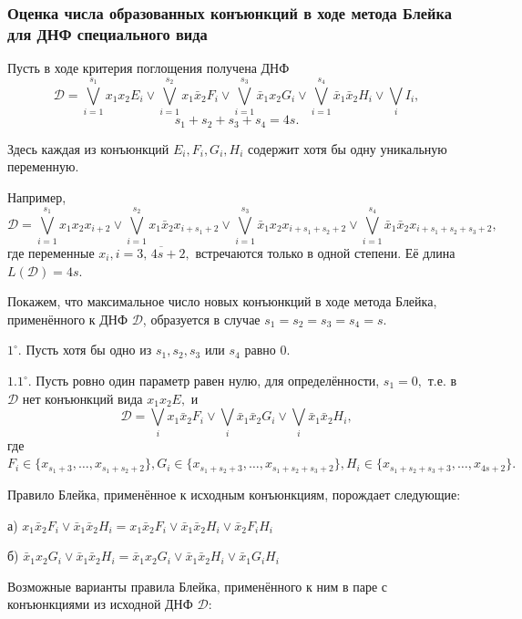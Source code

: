 \documentclass[12pt,a4paper,oneside,fleqn,leqno]{article}
\theoremstyle{definition}
\begin{document}
	\subsubsection*{Оценка числа образованных конъюнкций в ходе метода Блейка для ДНФ специального вида}
			Пусть в ходе критерия поглощения получена ДНФ
			$$
				\mathcal{D} = \bigvee_{i = 1}^{s_1}x_1x_2E_i \vee \bigvee_{i = 1}^{s_2}x_1\bar{x}_2F_i \vee \bigvee_{i = 1}^{s_3}\bar{x}_1x_2G_i \vee \bigvee_{i = 1}^{s_4}\bar{x}_1\bar{x}_2H_i \vee \bigvee_iI_i,
			$$
			$$
				s_1 + s_2 + s_3 + s_4 = 4s.
			$$\par
			Здесь каждая из конъюнкций $E_i, F_i, G_i, H_i$ содержит хотя бы одну уникальную переменную.\par
			Например,
			$$
				\mathcal{D} = \bigvee\limits_{i = 1}^{s_1}x_1x_2x_{i +2} \vee \bigvee\limits_{i = 1}^{s_2}x_1\bar{x}_2x_{i + s_1 + 2} \vee \bigvee\limits_{i = 1}^{s_3}\bar{x}_1x_2x_{i + s_1 + s_2 + 2} \vee \bigvee\limits_{i = 1}^{s_4}\bar{x}_1\bar{x}_2x_{i + s_1 + s_2 + s_3 + 2},
			$$
			где переменные $x_i, i = \overline{3,\,4s+2},$ встречаются только в одной степени. Её длина $L(\mathcal{D}) = 4s.$\par
			Покажем, что максимальное число новых конъюнкций в ходе метода Блейка, применённого к ДНФ $\mathcal{D}$, образуется в случае $s_1 = s_2 = s_3 = s_4 = s.$\par
			$1^{\circ}.$ Пусть хотя бы одно из $s_1, s_2, s_3$ или $s_4$ равно 0.\par
			$1.1^{\circ}.$ Пусть ровно один параметр равен нулю, для определённости, $s_1 = 0,$ т.е. в $\mathcal{D}$ нет конъюнкций вида $x_1x_2E,$ и
			$$\mathcal{D} = \bigvee_ix_1\bar{x}_2F_i \vee \bigvee_i\bar{x}_1\bar{x}_2G_i \vee \bigvee_i\bar{x}_1\bar{x}_2H_i,$$
			где $F_i \in \{x_{s_1 + 3}, \ldots, x_{s_1 + s_2 + 2}\}, G_i \in \{x_{s_1 + s_2 + 3}, \ldots, x_{s_1 + s_2 + s_3 + 2}\}, H_i \in \{x_{s_1 + s_2  + s_3 + 3}, \ldots, x_{4s + 2}\}.$\par
			Правило Блейка, применённое к исходным конъюнкциям, порождает следующие:\par
			а) $x_1\bar{x}_2F_i \vee \bar{x}_1\bar{x}_2H_i = x_1\bar{x}_2F_i \vee \bar{x}_1\bar{x}_2H_i \vee \bar{x}_2F_iH_i$\par
			б) $\bar{x}_1x_2G_i \vee \bar{x}_1\bar{x}_2H_i = \bar{x}_1x_2G_i \vee \bar{x}_1\bar{x}_2H_i \vee \bar{x}_1G_iH_i$\par
			Возможные варианты правила Блейка, применённого к ним в паре с конъюнкциями из исходной ДНФ $\mathcal{D}$:\par
\end{document}
